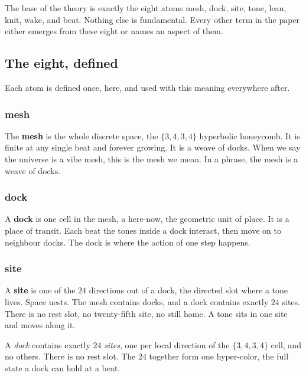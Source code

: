 \begin{axiom}
The base of the theory is exactly the eight atoms mesh, dock, site, tone, lean, knit, wake, and beat. Nothing else is fundamental. Every other term in the paper either emerges from these eight or names an aspect of them.
\end{axiom}

\subsection{The eight, defined}

Each atom is defined once, here, and used with this meaning everywhere after.

\subsubsection{mesh}

The \textbf{mesh} is the whole discrete space, the $\{3,4,3,4\}$ hyperbolic honeycomb. It is finite at any single beat and forever growing. It is a weave of docks. When we say the universe is a vibe mesh, this is the mesh we mean. In a phrase, the mesh is a weave of docks.

\subsubsection{dock}

A \textbf{dock} is one cell in the mesh, a here-now, the geometric unit of place. It is a place of transit. Each beat the tones inside a dock interact, then move on to neighbour docks. The dock is where the action of one step happens.

\subsubsection{site}

A \textbf{site} is one of the $24$ directions out of a dock, the directed slot where a tone lives. Space nests. The mesh contains docks, and a dock contains exactly $24$ sites. There is no rest slot, no twenty-fifth site, no still home. A tone sits in one site and moves along it.

\begin{definition}
A \emph{dock} contains exactly $24$ \emph{sites}, one per local direction of the $\{3,4,3,4\}$ cell, and no others. There is no rest slot. The $24$ together form one hyper-color, the full state a dock can hold at a beat.
\end{definition}

